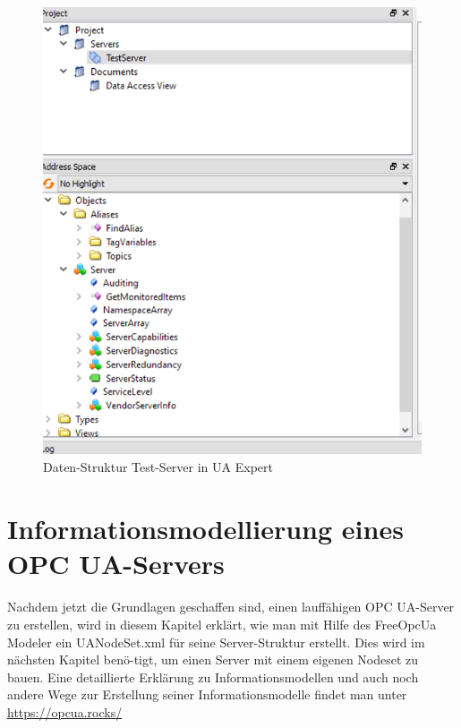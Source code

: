 \begin{figure}[H]
	\centering
	\includegraphics[width=0.6\linewidth]{abb/UA_Expert_Strukt}
	\caption{Daten-Struktur Test-Server in UA Expert}
	\label{fig:uaexpertstrukt}
\end{figure}
\clearpage
\section{Informationsmodellierung eines OPC UA-Servers}
Nachdem jetzt die Grundlagen geschaffen sind, einen lauffähigen OPC UA-Server zu erstellen, wird in diesem Kapitel erklärt, wie man mit Hilfe des FreeOpcUa Modeler ein UANodeSet.xml für seine Server-Struktur erstellt. Dies wird im nächsten Kapitel benö-tigt, um einen Server mit einem eigenen Nodeset zu bauen. Eine detaillierte Erklärung zu Informationsmodellen und auch noch andere Wege zur Erstellung seiner Informationsmodelle findet man unter \url{https://opcua.rocks/} 


